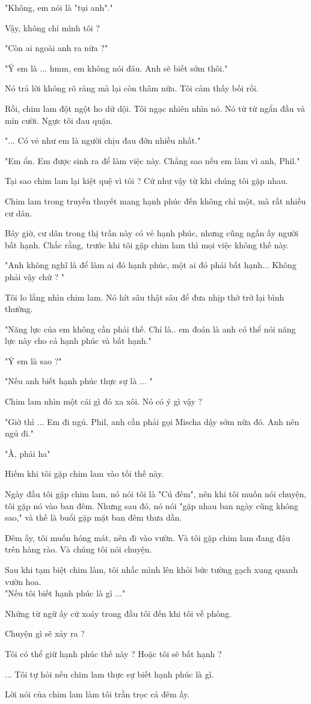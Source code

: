 "Không, em nói là "tụi anh"."

Vậy, không chỉ mình tôi ?

"Còn ai ngoài anh ra nữa ?"

"Ý em là ... hmm, em không nói đâu. Anh sẽ biết sớm thôi."

Nó trả lời không rõ ràng mà lại còn thâm nữa. Tôi cảm thấy bối rối.

Rồi, chim lam đột ngột ho dữ dội. Tôi ngạc nhiên nhìn nó. Nó từ từ ngẩn đầu và mỉn cười. Ngực tôi đau quặn.

"... Có vẻ như em là người chịu đau đớn nhiều nhất."

"Em ổn. Em được sinh ra để làm việc này. Chẳng sao nếu em làm vì anh, Phil."

Tại sao chim lam lại kiệt quệ vì tôi ? Cứ như vậy từ khi chúng tôi gặp nhau.

Chim lam trong truyền thuyết mang hạnh phúc đến không chỉ một, mà rất nhiều cư dân.

Bây giờ, cư dân trong thị trấn này có vẻ hạnh phúc, nhưng cũng ngần ấy người bất hạnh. Chắc rằng, trước khi tôi gặp chim lam thì mọi việc không thế này.

"Anh không nghĩ là để làm ai đó hạnh phúc, một ai đó phải bất hạnh... Không phải vậy chứ ? "

Tôi lo lắng nhìn chim lam. Nó hít sâu thật sâu để đưa nhịp thở trở lại bình thường.

"Năng lực của em không cần phải thế. Chỉ là.. em đoán là anh có thể nói năng lực này cho cả hạnh phúc và bất hạnh."

"Ý em là sao ?"

"Nếu anh biết hạnh phúc thực sự là ... "

Chim lam nhìn một cái gì đó xa xôi. Nó có ý gì vậy ? 

"Giờ thì ... Em đi ngủ. Phil, anh cần phải gọi Mischa dậy sớm nữa đó. Anh nên ngủ đi."

"À, phải ha"

Hiếm khi tôi gặp chim lam vào tối thế này.

Ngày đầu tôi gặp chim lam, nó nói tôi là "Cú đêm", nên khi tôi muốn nói chuyện, tôi gặp nó vào ban đêm. Nhưng sau đó, nó nói "gặp nhau ban ngày cũng không sao," và thế là buổi gặp mặt ban đêm thưa dần. 

Đêm ấy, tôi muốn hóng mát, nên đi vào vườn. Và tôi gặp chim lam đang đậu trên hàng rào. Và chúng tôi nói chuyện.

Sau khi tạm biệt chim làm, tôi nhấc mình lên khỏi bức tường gạch xung quanh vườn hoa. \\

"Nếu tôi biết hạnh phúc là gì ..."

Những từ ngữ ấy cứ xoáy trong đầu tôi đến khi tôi về phòng.

Chuyện gì sẽ xảy ra ?

Tôi có thể giữ hạnh phúc thế này ? Hoặc tôi sẽ bất hạnh ?

... Tôi tự hỏi nếu chim lam thực sự biết hạnh phúc là gì.

Lời nói của chim lam làm tôi trằn trọc cả đêm ấy.
 


